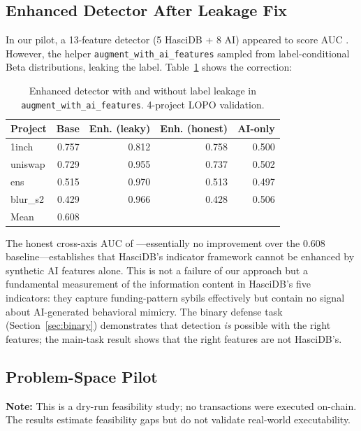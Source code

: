 \documentclass[sigconf,nonacm=false]{acmart}
\begin{document}
\subsection{Enhanced Detector After Leakage Fix}
\label{sec:leakage}

In our pilot, a 13-feature detector (5 HasciDB + 8 AI) appeared to score AUC \leakageFixLeakyAuc{}. However, the helper \texttt{augment\_with\_ai\_features} sampled from label-conditional Beta distributions, leaking the label. Table~\ref{tab:leakfix} shows the correction:

\begin{table}[t]
\caption{Enhanced detector with and without label leakage in \texttt{augment\_with\_ai\_features}. 4-project LOPO validation.}
\label{tab:leakfix}
\small
\begin{tabular}{lrrrr}
\toprule
Project & Base & Enh. (leaky) & Enh. (honest) & AI-only \\
\midrule
1inch    & 0.757 & 0.812 & 0.758 & 0.500 \\
uniswap  & 0.729 & 0.955 & 0.737 & 0.502 \\
ens      & 0.515 & 0.970 & 0.513 & 0.497 \\
blur\_s2 & 0.429 & 0.966 & 0.428 & 0.506 \\
\midrule
Mean    & 0.608 & \leakageFixLeakyAuc{} & \leakageFixHonestAuc{} & \leakageFixHonestAiOnlyAuc{} \\
\bottomrule
\end{tabular}
\end{table}

The honest cross-axis AUC of \leakageFixHonestAuc{}---essentially no improvement over the 0.608 baseline---establishes that HasciDB's indicator framework cannot be enhanced by synthetic AI features alone. This is not a failure of our approach but a fundamental measurement of the information content in HasciDB's five indicators: they capture funding-pattern sybils effectively but contain no signal about AI-generated behavioral mimicry. The binary defense task (Section~\ref{sec:binary}) demonstrates that detection \textit{is} possible with the right features; the main-task result shows that the right features are not HasciDB's.


\subsection{Problem-Space Pilot}
\label{sec:problemspace}

\textbf{Note:} This is a dry-run feasibility study; no transactions were executed on-chain. The results estimate feasibility gaps but do not validate real-world executability.
\end{document}
